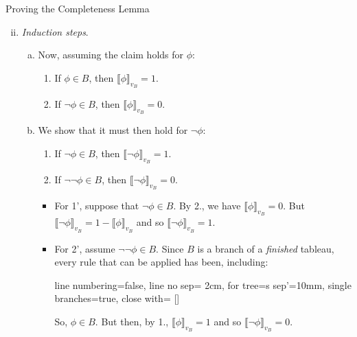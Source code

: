 \begin{frame}{Proving the Completeness Lemma}

\begin{enumerate}[(i)]
\setcounter{enumi}{1}
	
\item \emph{Induction steps}.
	
\medskip
	
	\begin{enumerate}[(a)]
	\itemsep=10pt

  	\item Now, assuming the claim holds for $\phi$:
		
				\begin{enumerate}[1.]
	
					\item If $\phi\in B$, then $\llbracket\phi\rrbracket_{v_B}=1$. 
	
					\item If $\neg \phi\in B$, then $\llbracket\phi\rrbracket_{v_B}=0$.
	
				\end{enumerate}

	\item We show that it must then hold for $\neg\phi$:
		\begin{enumerate}[1'.]
	
		\item If $\neg\phi\in B$, then $\llbracket\neg\phi\rrbracket_{v_B}=1$.
			\item If $\neg\neg \phi\in B$, then $\llbracket\neg\phi\rrbracket_{v_B}=0$.	
		\end{enumerate}
		
	\begin{itemize}
	\itemsep=10pt

	\medskip
	
	\item For 1', suppose that $\neg \phi\in B$. By 2., we have $\llbracket\phi\rrbracket_{v_B}=0$. But $\llbracket\neg\phi\rrbracket_{v_B}=1-\llbracket\phi\rrbracket_{v_B}$ and so $\llbracket\neg\phi\rrbracket_{v_B}=1$.
		
	\item For 2', assume $\neg\neg \phi\in B$. Since $B$ is a branch of a \emph{finished} tableau, every rule that can be applied has been, including:
		\begin{center}{\small
					\begin{prooftree}
					{
					line numbering=false,
					line no sep= 2cm,
					for tree={s sep'=10mm},
					single branches=true,
					close with=\xmark
					}
					[\neg\neg\phi [\phi ] ]
					\end{prooftree}}
		\end{center} 
		\medskip
		
		So, $\phi\in B$. But then, by 1., $\llbracket\phi\rrbracket_{v_B}=1$ and so $\llbracket\neg\phi\rrbracket_{v_B}=0$.
		
	\end{itemize}
	
	\end{enumerate}
			
	\end{enumerate}

\end{frame}


